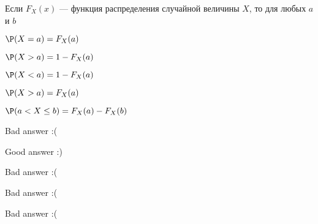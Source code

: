 
\begin{question}
Если \(F_X(x)\) --- функция распределения случайной величины \(X\), то
для любых \(a\) и \(b\)
\begin{answerlist}
  \item \(\P (X = a) = F_X(a)\)
  \item \(\P (X > a) = 1 - F_X(a)\)
  \item \(\P (X < a) = 1 - F_X(a)\)
  \item \(\P (X > a) = F_X(a)\)
  \item \(\P (a<X\le b) = F_X(a)-F_X(b)\)
\end{answerlist}
\end{question}

\begin{solution}
\begin{answerlist}
  \item Bad answer :(
  \item Good answer :)
  \item Bad answer :(
  \item Bad answer :(
  \item Bad answer :(
\end{answerlist}
\end{solution}

